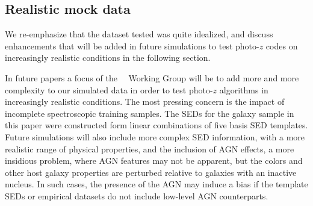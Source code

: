\subsection{Realistic mock data}
\label{sec:futuredata}

We re-emphasize that the dataset tested was quite idealized, and discuss enhancements that will be added in future simulations to test photo-$z$ codes on increasingly realistic conditions in the following section.


In future papers a focus of the \lsstdesc\ \Pz\ Working Group will be to add more and more complexity to our simulated data in order to test photo-$z$ algorithms in increasingly realistic conditions.
The most pressing concern is the impact of incomplete spectroscopic training samples.
The SEDs for the galaxy sample in this paper were constructed form linear combinations of five basis SED templates.
Future simulations will also include more complex SED information, with a more realistic range of physical properties, and the inclusion of AGN effects, a more insidious problem, where AGN features may not be apparent, but the colors and other host galaxy properties are perturbed relative to galaxies with an inactive nucleus.
In such cases, the presence of the AGN may induce a bias if the template SEDs or empirical datasets do not include low-level AGN counterparts.

